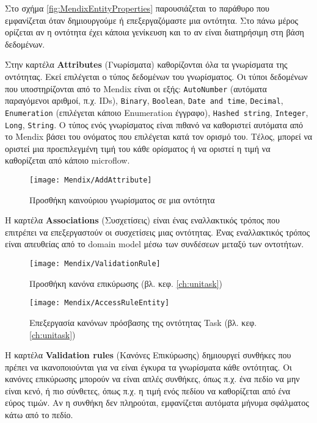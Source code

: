                 Στο σχήμα \ref{fig:MendixEntityProperties} παρουσιάζεται το παράθυρο που εμφανίζεται όταν δημιουργούμε ή επεξεργαζόμαστε μια οντότητα. Στο πάνω μέρος ορίζεται αν η οντότητα έχει κάποια γενίκευση και το αν είναι διατηρήσιμη στη βάση δεδομένων.

                Στην καρτέλα \textbf{Attributes} (Γνωρίσματα) καθορίζονται όλα τα γνωρίσματα της οντότητας. Εκεί επιλέγεται ο τύπος δεδομένων του γνωρίσματος. Οι τύποι δεδομένων που υποστηρίζονται από το Mendix είναι οι εξής: \texttt{AutoNumber} (αυτόματα παραγόμενοι αριθμοί, π.χ. IDs), \texttt{Binary}, \texttt{Boolean}, \texttt{Date and time}, \texttt{Decimal}, \texttt{Enumeration} (επιλέγεται κάποιο Enumeration έγγραφο), \texttt{Hashed string}, \texttt{Integer}, \texttt{Long}, \texttt{String}. Ο τύπος ενός γνωρίσματος είναι πιθανό να καθοριστεί αυτόματα από το Mendix βάσει του ονόματος που επιλέγεται κατά τον ορισμό του. Τέλος, μπορεί να οριστεί μια προεπιλεγμένη τιμή του κάθε ορίσματος ή να οριστεί η τιμή να καθορίζεται από κάποιο microflow.

                \begin{figure}[h!] \noindent \centering
                        \texttt{[image: Mendix/AddAttribute]}
                        \caption{\centering Προσθήκη καινούριου γνωρίσματος σε μια οντότητα}
                \end{figure}

                Η καρτέλα \textbf{Associations} (Συσχετίσεις) είναι ένας εναλλακτικός τρόπος που επιτρέπει να επεξεργαστούν οι συσχετίσεις μιας οντότητας. Ένας εναλλακτικός τρόπος είναι απευθείας από το domain model μέσω των συνδέσεων μεταξύ των οντοτήτων.

                \begin{figure}[h!] \noindent \centering
                        \texttt{[image: Mendix/ValidationRule]}
                        \caption{\centering Προσθήκη κανόνα επικύρωσης (βλ. κεφ. \ref{ch:unitask})}
                \end{figure}

                \begin{figure}[h!] \noindent \centering
                        \texttt{[image: Mendix/AccessRuleEntity]}
                        \caption{\centering Επεξεργασία κανόνων πρόσβασης της οντότητας Task (βλ. κεφ. \ref{ch:unitask})}
                \end{figure}

                Η καρτέλα \textbf{Validation rules} (Κανόνες Επικύρωσης) δημιουργεί συνθήκες που πρέπει να ικανοποιούνται για να είναι έγκυρα τα γνωρίσματα κάθε οντότητας. Οι κανόνες επικύρωσης μπορούν να είναι απλές συνθήκες, όπως π.χ. ένα πεδίο να μην είναι κενό, ή πιο σύνθετες, όπως π.χ. η τιμή ενός πεδίου να καθορίζεται από ένα εύρος τιμών. Αν η συνθήκη δεν πληρούται, εμφανίζεται αυτόματα μήνυμα σφάλματος κάτω από το πεδίο.

